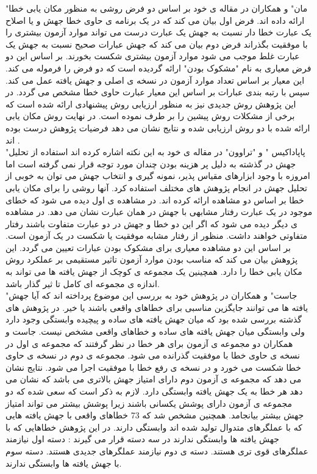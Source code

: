 "مان" و همکاران در مقاله ی خود بر اساس دو فرض روشی به منظور مکان یابی خطا ارائه داده اند. فرض اول بیان می کند که  در یک برنامه ی حاوی خطا جهش و یا اصلاح یک عبارت خطا دار نسبت به جهش یک عبارت درست می تواند موارد آزمون بیشتری را  با موفقیت بگذراند فرض دوم  بیان می کند که جهش عبارات صحیح نسبت به جهش یک عبارت غلط موجب می شود موارد آزمون بیشتری شکست بخورند. بر اساس این دو فرض معیاری به نام "مشکوک بودن"  ارائه گردیده است که دو فرض را فرموله می کند. این معیار بر اساس تعداد موارد آزمون در نسخه ی اصلی و جهش یافته عمل می کند. سپس با رتبه بندی عبارات بر اساس این معیار عبارت حاوی خطا مشخص می گردد. در این پژوهش روش جدیدی نیز به منظور ارزیابی روش پیشنهادی ارائه شده است که برخی از مشکلات روش پیشین را بر طرف نموده است. در نهایت روش مکان یابی ارائه شده با دو روش ارزیابی شده و نتایج نشان می دهد فرضیات پژوهش درست بوده اند \cite{moon2014ask}. \\

"پاپاداکیس " و "تراوون" در مقاله ی خود به این نکته اشاره کرده اند استفاده از تحلیل جهش در گذشته به دلیل پر هزینه بودن چندان مورد توجه قرار نمی گرفته است اما امروزه با وجود ابزارهای مقیاس پذیر، نمونه گیری و انتخاب جهش می توان به خوبی از تحلیل جهش در انجام پژوهش های مختلف استفاده کرد\cite{papadakis2015metallaxis}. آنها روشی را برای مکان یابی خطا بر اساس دو مشاهده ارائه کرده اند. در مشاهده ی اول دیده می شود که خطای موجود در یک عبارت رفتار مشابهی با جهش در همان عبارت نشان می دهد. در مشاهده ی دیگر دیده می شود که اگر این دو خطا و جهش در دو عبارت متفاوت باشند رفتار متفاوتی خواهند داشت. منظور از رفتار مشابه موفقیت یا شکست در یک آزمون است. بر اساس این دو مشاهده معیاری برای مشکوک بودن عبارات تعیین می گردد. این پژوهش بیان می کند که مناسب بودن موارد آزمون تاثیر مستقیمی بر عملکرد روش مکان یابی خطا را دارد. همچینین یک مجموعه ی کوچک از جهش یافته ها می تواند به اندازه ی مجموعه ای کامل تا ثیر گذار باشد. \\

"جاست" و همکاران در پژوهش خود به بررسی این موضوع پرداخته اند که آیا جهش یافته ها می توانند جایگزین مناسبی برای خطاهای واقعی باشند یا خیر\cite{just2014mutants}. در پژوهش های گذشته بررسی شده بود که میان جهش یافته های ساده و پیچیده وابستگی وجود دارد ولی وابستگی میان جهش یافته های ساده و خطاهای واقعی مشخص نیست. جاست و همکاران دو مجموعه ی آزمون برای هر خطا در نظر گرفتند که مجموعه ی اول در نسخه ی حاوی خطا با موفقیت گذرانده می شود. مجموعه ی دوم در نسخه ی حاوی خطا شکست می خورد و در نسخه ی رفع خطا با موفقیت اجرا می شود. نتایج نشان می دهد که مجموعه ی آزمون دوم دارای امتیاز جهش بالاتری می باشد که نشان می دهد هر خطا به یک جهش یافته وابستگی دارد. لازم به ذکر است که سعی شده که دو مجموعه ی آزمون دارای پوشش یکسانی باشند زیرا پوشش بیشتر می تواند امتیاز جهش بیشتر بیانجامد. همچنین مشخص شد که  
73 \lr{\%} 
 خطاهای واقعی با جهش یافته هایی که  با عملگرهای متدوال تولید شده اند وابستگی دارند. در این پژوهش خطاهایی که با جهش یافته ها وابستگی ندارند در سه دسته قرار می گیرند : دسته اول نیازمند عملگرهای قوی تری هستند. دسته ی دوم نیازمند عملگرهای جدیدی هستند. دسته سوم با جهش یافته ها وابستگی ندارند.\\
 
